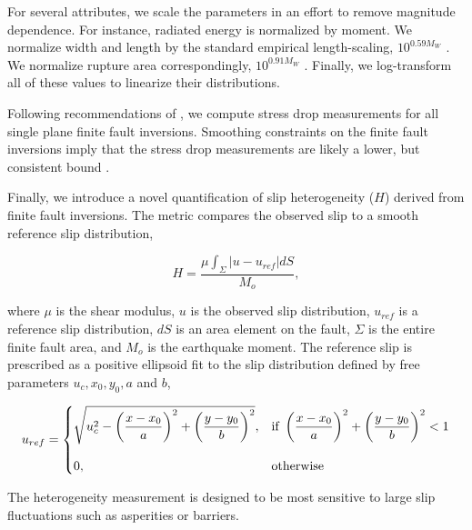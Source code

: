\documentclass[draft, jgrga]{agujournal2018}
\begin{document}
For several attributes, we scale the parameters in an effort to remove magnitude dependence. For instance, radiated energy is normalized by moment. We normalize width and length by the standard empirical length-scaling, $10^{0.59M_W}$ \citep[][Table 2A - Subsurface rupture dimensions]{Wells1994}. We normalize rupture area correspondingly, $10^{0.91M_W}$ \citep[][Table 2A - Rupture area]{Wells1994}. Finally, we log-transform all of these values to linearize their distributions. 

Following recommendations of \citet{Noda2013}, we compute stress drop measurements for all single plane finite fault inversions. Smoothing constraints on the finite fault inversions imply that the stress drop measurements are likely a lower, but consistent bound \citep{Adams2017ExploringInversions}. 

Finally, we introduce a novel quantification of slip heterogeneity ($H$) derived from finite fault inversions. The metric compares the observed slip to a smooth reference slip distribution,
%
\begin{linenomath*}
\begin{equation}
    H = \dfrac{\mu \int_\Sigma |u-u_{ref}| dS}{M_o},
\end{equation}
\end{linenomath*}
%
where $\mu$ is the shear modulus, $u$ is the observed slip distribution, $u_{ref}$ is a reference slip distribution, $dS$ is an area element on the fault, $\Sigma$ is the entire finite fault area, and $M_o$ is the earthquake moment. The reference slip is prescribed as a positive ellipsoid fit to the slip distribution defined by free parameters $u_{c}, x_0, y_0, a$ and $b$,
%
\begin{linenomath*}
\begin{equation}\label{eq:heterogeneity}
u_{ref}=\left\{
\begin{array}{@{}ll@{}}
     \sqrt{u_{c}^2 - \left(\dfrac{x-x_0}{a}\right)^2 +  \left(\dfrac{y-y_0}{b}\right)^2}, & \text{if}\ \left(\dfrac{x-x_0}{a}\right)^2 +  \left(\dfrac{y-y_0}{b}\right)^2 < 1 \\
     \\
    0, & \text{otherwise}
    \end{array}\right.
\end{equation}
\end{linenomath*}
%
The heterogeneity measurement is designed to be most sensitive to large slip fluctuations such as asperities or barriers.
\end{document}
